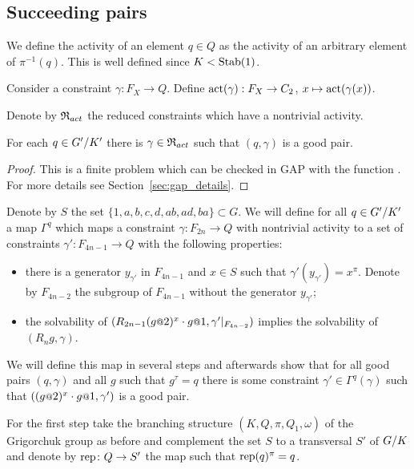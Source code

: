 \documentclass[a4paper,11pt]{amsart}
\begin{document}
\subsection{Succeeding pairs}
\begin{defi}
 We define the activity of an element $q\in Q$ as the activity of an arbitrary element of $\pi^{-1}(q)$. 
 This is well defined since $K<\operatorname{Stab}(1)$. 
 
 Consider a constraint $\gamma\colon F_X \to Q$. 
 Define $\operatorname{act}(\gamma): F_X\to C_2$, $x \mapsto \operatorname{act}(\gamma(x))$.
 
 Denote by $\mathfrak{R}_{act}$ the reduced constraints which have a nontrivial activity.
\end{defi}

\begin{lem} \label{lem:existsGoodGamma}
 For each $q\in{G'/K'}$ there is $\gamma\in \mathfrak{R}_{act}$ such that $(q,\gamma)$ is a 
 good pair.
\end{lem}
\begin{proof}
 This is a finite problem which can be checked in GAP with the function .
 For more details see Section~\ref{sec:gap_details}.
\end{proof}

Denote by $S$ the set $\{1,a,b,c,d,ab,ad,ba\}\subset G$.
We will define for all $q\in {G'/K'}$ a map $\Gamma^q$ which maps a constraint
$\gamma\colon F_{2n} \to Q$ with nontrivial activity to a set of constraints $\gamma'\colon F_{4n-1}\to Q$ 
with the following properties:
\begin{itemize}
  \item there is a generator $y_{\gamma'}$ in $F_{4n-1}$ and $x\in S$ such that $\gamma'(y_{\gamma'})=x^\pi$.
    Denote by $F_{4n-2}$ the subgroup of $F_{4n-1}$ without the generator $y_{\gamma'}$;
  \item the solvability of $(R_{2n-1} (g\at{2})^x \cdot g\at{1},\gamma'|_{F_{4n-2}})$ implies
  the solvability of $(R_ng,\gamma)$.
 \end{itemize}

 We will define this map in several steps and afterwards show that for all good pairs $(q,\gamma)$ and all $g$ such that $g^\tau=q$ 
 there is some constraint $\gamma' \in \Gamma^q(\gamma)$ such that $((g\at{2})^x \cdot g\at{1},\gamma')$ is a good pair.
 
 For the first step take the branching structure $(K,Q,\pi,Q_1,\omega)$ of the Grigorchuk group as before and 
 complement the set $S$ to a transversal $S'$ of ${G/K}$ and denote by $\textup{rep}\colon Q\to S'$ 
 the map such that $\textup{rep}(q)^\pi = q$.
 
\end{document}
